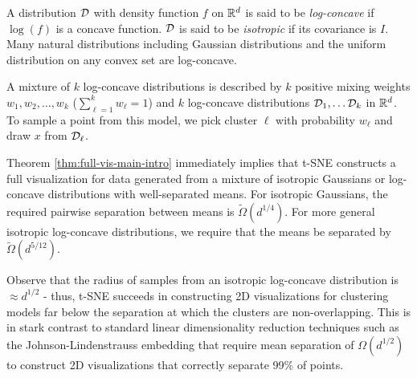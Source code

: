 A distribution $\mathcal{D}$ with density function $f$ on $\mathbb{R}^d$ is said to be \emph{log-concave} if $\log(f)$ is a concave function. $\mathcal{D}$ is said to be \emph{isotropic} if its covariance is $I$. Many natural distributions including Gaussian distributions and the uniform distribution on any convex set are log-concave. 

A mixture of $k$ log-concave distributions is described by %
$k$ positive mixing weights $w_1, w_2,\ldots, w_k$ ($\sum_{\ell=1}^k w_\ell = 1$) and $k$ log-concave distributions $\mathcal{D}_1, \ldots \mathcal{D}_k$ in $\mathbb{R}^d$. To sample a point from this model, we pick cluster $\ell$ with probability $w_\ell$ and draw $x$  from $\mathcal{D}_\ell$. %

Theorem \ref{thm:full-vis-main-intro} immediately implies that t-SNE constructs a full visualization for data generated from a mixture of isotropic Gaussians or log-concave distributions with well-separated means. For isotropic Gaussians, the required pairwise separation between means is $\tilde\Omega(d^{1/4})$. For more general isotropic log-concave distributions, we require that the means be separated by $\tilde \Omega(d^{5/12})$. 

Observe that the radius of samples from an isotropic log-concave distribution is $\approx d^{1/2}$ - thus, t-SNE succeeds in constructing 2D visualizations for clustering models far below the separation at which the clusters are non-overlapping. This is in stark contrast to standard linear dimensionality reduction techniques such as the Johnson-Lindenstrauss embedding that require mean separation of $\Omega(d^{1/2})$ to construct 2D visualizations that correctly separate 99\% of points. 








